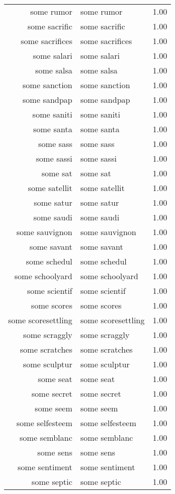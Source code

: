 \begin{table}[ht]
\begin{tabular}{rlr}
  some rumor & some rumor & 1.00 \\ 
  some sacrific & some sacrific & 1.00 \\ 
  some sacrifices & some sacrifices & 1.00 \\ 
  some salari & some salari & 1.00 \\ 
  some salsa & some salsa & 1.00 \\ 
  some sanction & some sanction & 1.00 \\ 
  some sandpap & some sandpap & 1.00 \\ 
  some saniti & some saniti & 1.00 \\ 
  some santa & some santa & 1.00 \\ 
  some sass & some sass & 1.00 \\ 
  some sassi & some sassi & 1.00 \\ 
  some sat & some sat & 1.00 \\ 
  some satellit & some satellit & 1.00 \\ 
  some satur & some satur & 1.00 \\ 
  some saudi & some saudi & 1.00 \\ 
  some sauvignon & some sauvignon & 1.00 \\ 
  some savant & some savant & 1.00 \\ 
  some schedul & some schedul & 1.00 \\ 
  some schoolyard & some schoolyard & 1.00 \\ 
  some scientif & some scientif & 1.00 \\ 
  some scores & some scores & 1.00 \\ 
  some scoresettling & some scoresettling & 1.00 \\ 
  some scraggly & some scraggly & 1.00 \\ 
  some scratches & some scratches & 1.00 \\ 
  some sculptur & some sculptur & 1.00 \\ 
  some seat & some seat & 1.00 \\ 
  some secret & some secret & 1.00 \\ 
  some seem & some seem & 1.00 \\ 
  some selfesteem & some selfesteem & 1.00 \\ 
  some semblanc & some semblanc & 1.00 \\ 
  some sens & some sens & 1.00 \\ 
  some sentiment & some sentiment & 1.00 \\ 
  some septic & some septic & 1.00 \\ 

\end{tabular}
\end{table}
